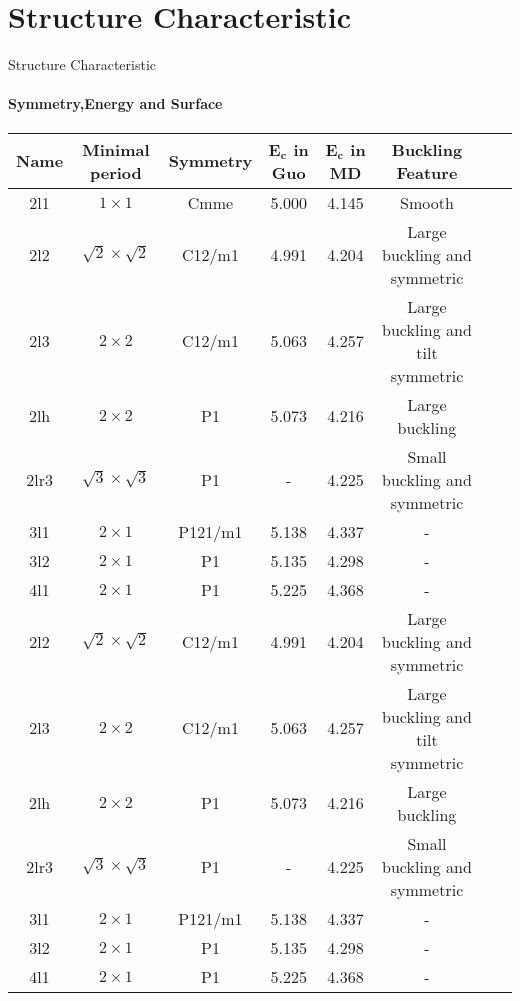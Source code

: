 \documentclass{beamer}
\begin{document}
\section{Structure Characteristic}
\begin{frame}{Structure Characteristic}
  \framesubtitle{Symmetry,Energy and Surface}%
  \begin{table}[!b]
    \tiny
    {\carlitoTLF %
      \begin{tabular}{cccccccc}
        \textbf{Name}
             & \textbf{Minimal period}
             & \textbf{Symmetry}
             & \textbf{$\mathbf{E_c}$ in Guo}
             & \textbf{$\mathbf{E_c}$ in MD}
             & \textbf{Buckling Feature}                                                                    \\
        \toprule
        2l1  & $1 \times 1$                   & Cmme    & 5.000 & 4.145 & Smooth                            \\
        2l2  & $\sqrt{2}\times\sqrt{2}$       & C12/m1  & 4.991 & 4.204 & Large buckling and symmetric      \\
        2l3  & $2 \times 2$                   & C12/m1  & 5.063 & 4.257 & Large buckling and tilt symmetric \\
        2lh  & $2 \times 2$                   & P1      & 5.073 & 4.216 & Large buckling                    \\
        2lr3 & $\sqrt{3}\times\sqrt{3}$       & P1      & -     & 4.225 & Small buckling and symmetric      \\
        3l1  & $2 \times 1$                   & P121/m1 & 5.138 & 4.337 & -                                 \\
        3l2  & $2 \times 1$                   & P1      & 5.135 & 4.298 & -                                 \\
        4l1  & $2 \times 1$                   & P1      & 5.225 & 4.368 & -                                 \\
        2l2  & $\sqrt{2}\times\sqrt{2}$       & C12/m1  & 4.991 & 4.204 & Large buckling and symmetric      \\
        2l3  & $2 \times 2$                   & C12/m1  & 5.063 & 4.257 & Large buckling and tilt symmetric \\
        2lh  & $2 \times 2$                   & P1      & 5.073 & 4.216 & Large buckling                    \\
        2lr3 & $\sqrt{3}\times\sqrt{3}$       & P1      & -     & 4.225 & Small buckling and symmetric      \\
        3l1  & $2 \times 1$                   & P121/m1 & 5.138 & 4.337 & -                                 \\
        3l2  & $2 \times 1$                   & P1      & 5.135 & 4.298 & -                                 \\
        4l1  & $2 \times 1$                   & P1      & 5.225 & 4.368 & -                                 \\
        \bottomrule
      \end{tabular}
    }


\end{table}
\end{frame}
\end{document}
